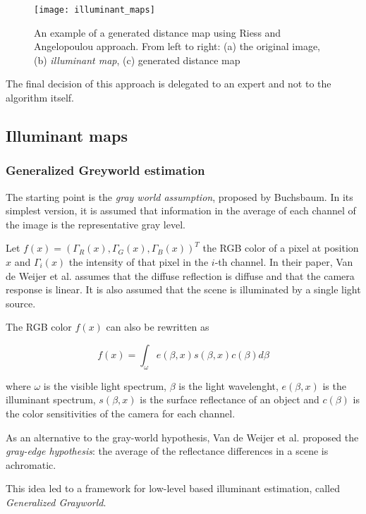 \begin{figure}
  \centering
    \texttt{[image: illuminant\_maps]}
    \caption{An example of a generated distance map using Riess and Angelopoulou\cite{riess2010scene} approach. From left to right: (a) the original image, (b) \emph{illuminant map}, (c) generated distance map}
    \label{illuminant_maps}
\end{figure}

The final decision of this approach is delegated to an expert and not to the algorithm itself.

\subsection{Illuminant maps}


\subsubsection{Generalized Greyworld estimation}

The starting point is the \emph{gray world assumption}, proposed by Buchsbaum\cite{Buchsbaum19801}. In its simplest version, it is assumed that information in the average of each channel of the image is the representative gray level.

Let $f(x) = (\Gamma_R(x), \Gamma_G(x), \Gamma_B(x))^T$ the RGB color of a pixel at position $x$ and $\Gamma_i(x)$ the intensity of that pixel in the $i$-th channel. In their paper, Van de Weijer et al. assumes that the diffuse reflection is diffuse and that the camera response is linear. It is also assumed that the scene is illuminated by a single light source.

The RGB color $f(x)$ can also be rewritten as

\begin{equation}
f(x) = \int_{\omega} e(\beta, x) s(\beta, x) c(\beta) d\beta
\end{equation}

where $\omega$ is the visible light spectrum, $\beta$ is the light wavelenght, $e(\beta, x)$ is the illuminant spectrum, $s(\beta, x)$ is the surface reflectance of an object and $c(\beta)$ is the color sensitivities of the camera for each channel.

As an alternative to the gray-world hypothesis, Van de Weijer et al.\cite{van2007edge} proposed the \emph{gray-edge hypothesis}: the average of the reflectance differences in a scene is achromatic.

This idea led to a framework for low-level based illuminant estimation, called \emph{Generalized Grayworld}.

